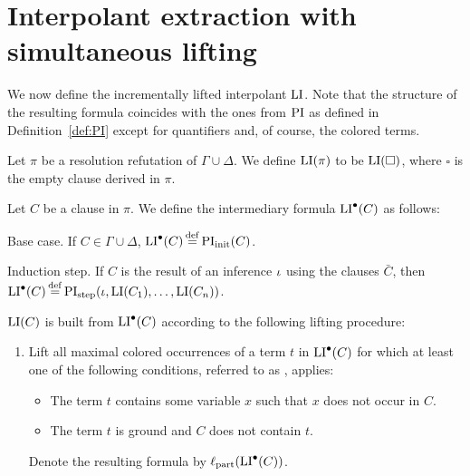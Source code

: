 

\section{Interpolant extraction with simultaneous lifting}

We now define the incrementally lifted interpolant $\operatorname{LI}$.
Note that the structure of the resulting formula coincides with the ones from $\operatorname{PI}$ as defined in Definition~\ref{def:PI} except for quantifiers and, of course, the colored terms.

\begin{defi}
	Let $\pi$ be a resolution refutation of $\Gamma \cup \Delta$.
	We define $\operatorname{LI}(\pi)$ to be $\operatorname{LI}(\square)$, where $\square$ is the empty clause derived in $\pi$.

	Let $C$ be a clause in $\pi$. 
	We define the intermediary formula $\operatorname{LI}^\bullet(C)$ as follows:
	\begin{description}
		\item{} Base case.
			If $C \in \Gamma\cup \Delta$, $\LIpre(C) \defeq \PIinit(C)$.

		\item{} Induction step.
			If $C$ is the result of an inference $\iota$ using the clauses $\bar C$, then $\LIpre(C) \defeq \PIstep(\inference, \LI(C_1), \dots, \LI(C_n))$.

	\end{description}

	\noindent
	$\operatorname{LI}(C)$ is built from $\operatorname{LI}^\bullet(C)$ according to the following lifting procedure:

	\begin{enumerate}
		\item Lift all maximal colored occurrences of a term $t$ in $\operatorname{LI}^\bullet(C)$ for which at least one of the following conditions, referred to as , applies:
			\begin{itemize} 
				\item The term $t$ contains some variable $x$ such that $x$ does not occur in\nolinebreak{} $C$.
				\item The term $t$ is ground and $C$ does not contain $t$.
			\end{itemize} 
			Denote the resulting formula by $\ell_\mathrm{part}(\operatorname{LI}^\bullet(C))$.


\end{enumerate}
\end{defi}
